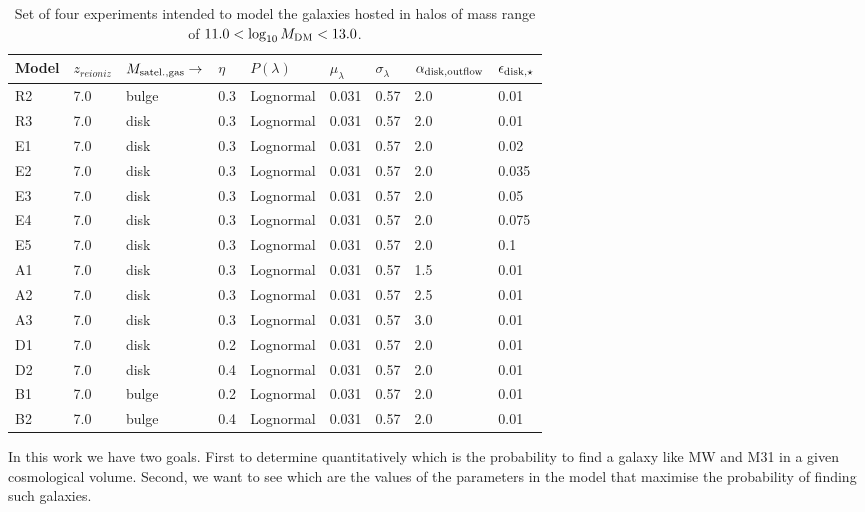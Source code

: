 \documentclass[useAMS,usenatbib]{mn2e}
\begin{document}
\begin{table}
\centering
\begin{tabular}{|l|l|l|l|l|l|l|l|l|}
\hline
\hline
Model  &  $z_{reioniz}$ &  $M_{{\rm satel.,gas}}\to$  & $\eta$ & $P(\lambda)$  &  $\mu_\lambda$
 & $\sigma_\lambda$  & $\alpha_{{\rm disk,outflow}}$ & $\epsilon_{{\rm disk},\star}$ \\
\hline
\hline


R2 & 7.0 &  bulge & 0.3 &Lognormal & 0.031 & 0.57 & 2.0 & 0.01 \\
R3 & 7.0 &  disk & 0.3 &Lognormal  & 0.031  & 0.57 & 2.0 & 0.01 \\
\hline
E1 & 7.0 &  disk & 0.3 &Lognormal  & 0.031 & 0.57 & 2.0 & 0.02 \\
E2 & 7.0 &  disk & 0.3 &Lognormal  & 0.031 & 0.57 & 2.0 & 0.035 \\
E3 & 7.0 &  disk & 0.3 &Lognormal  & 0.031 & 0.57 & 2.0 & 0.05 \\
E4 & 7.0 &  disk & 0.3 &Lognormal  & 0.031 & 0.57 & 2.0 & 0.075 \\
E5 & 7.0 &  disk & 0.3 &Lognormal  & 0.031 & 0.57 & 2.0 & 0.1 \\
\hline
A1 & 7.0 &  disk & 0.3 &Lognormal  & 0.031 & 0.57 & 1.5 & 0.01 \\
A2 & 7.0 &  disk & 0.3 &Lognormal  & 0.031 & 0.57 & 2.5 & 0.01 \\
A3 & 7.0 &  disk & 0.3 &Lognormal  & 0.031 & 0.57 & 3.0 & 0.01 \\
\hline
D1 & 7.0 &  disk & 0.2 &Lognormal  & 0.031 & 0.57 & 2.0 & 0.01 \\
D2 & 7.0 &  disk & 0.4 &Lognormal  & 0.031 & 0.57 & 2.0 & 0.01 \\
\hline
B1 & 7.0 &  bulge & 0.2 &Lognormal & 0.031 & 0.57 & 2.0 & 0.01 \\
B2 & 7.0 &  bulge & 0.4 &Lognormal & 0.031 & 0.57 & 2.0 & 0.01 \\
\hline
\hline
\end{tabular}

\caption{Set of four experiments intended to model the galaxies hosted
  in halos of mass range of $11.0<\log_{10} M_{{\rm
      DM}}<13.0$.}
\label{tab:runs}
\end{table}


In this work we have two goals. First to determine quantitatively
which is the probability to find a galaxy like MW and M31 in a given
cosmological volume. Second, we want to see which are the values of
the parameters in the model that maximise the probability of finding
such galaxies.
\end{document}
